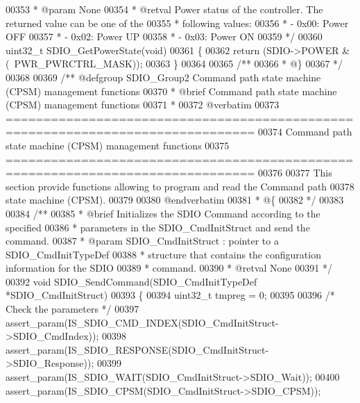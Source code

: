 \begin{DoxyCode}
00353 \textcolor{comment}{  * @param  None}
00354 \textcolor{comment}{  * @retval Power status of the controller. The returned value can be one of the }
00355 \textcolor{comment}{  *         following values:}
00356 \textcolor{comment}{  *            - 0x00: Power OFF}
00357 \textcolor{comment}{  *            - 0x02: Power UP}
00358 \textcolor{comment}{  *            - 0x03: Power ON }
00359 \textcolor{comment}{  */}
00360 uint32\_t SDIO_GetPowerState(\textcolor{keywordtype}{void})
00361 \{
00362   \textcolor{keywordflow}{return} (SDIO->POWER & (~PWR_PWRCTRL_MASK));
00363 \}
00364 
00365 \textcolor{comment}{/**}
00366 \textcolor{comment}{  * @\}}
00367 \textcolor{comment}{  */}
00368 
00369 \textcolor{comment}{/** @defgroup SDIO\_Group2 Command path state machine (CPSM) management functions}
00370 \textcolor{comment}{ *  @brief   Command path state machine (CPSM) management functions }
00371 \textcolor{comment}{ *}
00372 \textcolor{comment}{@verbatim   }
00373 \textcolor{comment}{ ===============================================================================}
00374 \textcolor{comment}{              Command path state machine (CPSM) management functions}
00375 \textcolor{comment}{ ===============================================================================  }
00376 \textcolor{comment}{}
00377 \textcolor{comment}{  This section provide functions allowing to program and read the Command path }
00378 \textcolor{comment}{  state machine (CPSM).}
00379 \textcolor{comment}{}
00380 \textcolor{comment}{@endverbatim}
00381 \textcolor{comment}{  * @\{}
00382 \textcolor{comment}{  */}
00383 
00384 \textcolor{comment}{/**}
00385 \textcolor{comment}{  * @brief  Initializes the SDIO Command according to the specified }
00386 \textcolor{comment}{  *         parameters in the SDIO\_CmdInitStruct and send the command.}
00387 \textcolor{comment}{  * @param  SDIO\_CmdInitStruct : pointer to a SDIO\_CmdInitTypeDef }
00388 \textcolor{comment}{  *         structure that contains the configuration information for the SDIO }
00389 \textcolor{comment}{  *         command.}
00390 \textcolor{comment}{  * @retval None}
00391 \textcolor{comment}{  */}
00392 \textcolor{keywordtype}{void} SDIO_SendCommand(SDIO\_CmdInitTypeDef *SDIO\_CmdInitStruct)
00393 \{
00394   uint32\_t tmpreg = 0;
00395 
00396   \textcolor{comment}{/* Check the parameters */}
00397   assert_param(IS\_SDIO\_CMD\_INDEX(SDIO\_CmdInitStruct->SDIO\_CmdIndex));
00398   assert_param(IS\_SDIO\_RESPONSE(SDIO\_CmdInitStruct->SDIO\_Response));
00399   assert_param(IS\_SDIO\_WAIT(SDIO\_CmdInitStruct->SDIO\_Wait));
00400   assert_param(IS\_SDIO\_CPSM(SDIO\_CmdInitStruct->SDIO\_CPSM));

\end{DoxyCode}
